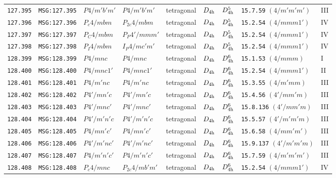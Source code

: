 \documentclass[fleqn,10pt]{jsarticle}
\begin{document}
\begin{center}
\begin{longtable}{lllllllll}
\texttt{127.395} & \texttt{MSG:127.395} & $P4/m'b'm'$ & $P4/m'b'm'$ & tetragonal & $D_{\rm 4h}$ & $D_{\rm 4h}^{5}$ & \texttt{15.7.59} $(4/m'm'm')$ & III \\
\texttt{127.396} & \texttt{MSG:127.396} & $P_{c}4/mbm$ & $P_{2c}4/mbm$ & tetragonal & $D_{\rm 4h}$ & $D_{\rm 4h}^{5}$ & \texttt{15.2.54} $(4/mmm1')$ & IV \\
\texttt{127.397} & \texttt{MSG:127.397} & $P_{C}4/mbm$ & $P_{P}4'/mmm'$ & tetragonal & $D_{\rm 4h}$ & $D_{\rm 4h}^{5}$ & \texttt{15.2.54} $(4/mmm1')$ & IV \\
\texttt{127.398} & \texttt{MSG:127.398} & $P_{I}4/mbm$ & $I_{P}4/mc'm'$ & tetragonal & $D_{\rm 4h}$ & $D_{\rm 4h}^{5}$ & \texttt{15.2.54} $(4/mmm1')$ & IV \\ \hline
\texttt{128.399} & \texttt{MSG:128.399} & $P4/mnc$ & $P4/mnc$ & tetragonal & $D_{\rm 4h}$ & $D_{\rm 4h}^{6}$ & \texttt{15.1.53} $(4/mmm)$ & I \\
\texttt{128.400} & \texttt{MSG:128.400} & $P4/mnc1'$ & $P4/mnc1'$ & tetragonal & $D_{\rm 4h}$ & $D_{\rm 4h}^{6}$ & \texttt{15.2.54} $(4/mmm1')$ & II \\
\texttt{128.401} & \texttt{MSG:128.401} & $P4/m'nc$ & $P4/m'nc$ & tetragonal & $D_{\rm 4h}$ & $D_{\rm 4h}^{6}$ & \texttt{15.3.55} $(4/m'mm)$ & III \\
\texttt{128.402} & \texttt{MSG:128.402} & $P4'/mn'c$ & $P4'/mn'c$ & tetragonal & $D_{\rm 4h}$ & $D_{\rm 4h}^{6}$ & \texttt{15.4.56} $(4'/mm'm)$ & III \\
\texttt{128.403} & \texttt{MSG:128.403} & $P4'/mnc'$ & $P4'/mnc'$ & tetragonal & $D_{\rm 4h}$ & $D_{\rm 4h}^{6}$ & \texttt{15.8.136} $(4'/mm'm)$ & III \\
\texttt{128.404} & \texttt{MSG:128.404} & $P4'/m'n'c$ & $P4'/m'n'c$ & tetragonal & $D_{\rm 4h}$ & $D_{\rm 4h}^{6}$ & \texttt{15.5.57} $(4'/m'm'm)$ & III \\
\texttt{128.405} & \texttt{MSG:128.405} & $P4/mn'c'$ & $P4/mn'c'$ & tetragonal & $D_{\rm 4h}$ & $D_{\rm 4h}^{6}$ & \texttt{15.6.58} $(4/mm'm')$ & III \\
\texttt{128.406} & \texttt{MSG:128.406} & $P4'/m'nc'$ & $P4'/m'nc'$ & tetragonal & $D_{\rm 4h}$ & $D_{\rm 4h}^{6}$ & \texttt{15.9.137} $(4'/m'm'm)$ & III \\
\texttt{128.407} & \texttt{MSG:128.407} & $P4/m'n'c'$ & $P4/m'n'c'$ & tetragonal & $D_{\rm 4h}$ & $D_{\rm 4h}^{6}$ & \texttt{15.7.59} $(4/m'm'm')$ & III \\
\texttt{128.408} & \texttt{MSG:128.408} & $P_{c}4/mnc$ & $P_{2c}4/mb'm'$ & tetragonal & $D_{\rm 4h}$ & $D_{\rm 4h}^{6}$ & \texttt{15.2.54} $(4/mmm1')$ & IV \\

\end{longtable}
\end{center}
\end{document}
